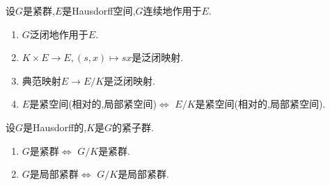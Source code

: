 \begin{proposition}{}{}
	设$G$是紧群,$E$是Hausdorff空间,$G$连续地作用于$E$.
	\begin{enumerate}
		\item $G$泛闭地作用于$E$.
		\item $K\times E\to E,\left(s,x\right)\mapsto sx$是泛闭映射.
		\item 典范映射$E\to E/K$是泛闭映射.
		\item $E$是紧空间(相对的,局部紧空间)$\iff$ $E/K$是紧空间(相对的,局部紧空间).
	\end{enumerate}
\end{proposition}

\begin{corollary}{}{}
	设$G$是Hausdorff的,$K$是$G$的紧子群.
	\begin{enumerate}
		\item $G$是紧群$\iff$ $G/K$是紧群.
		\item $G$是局部紧群$\iff$ $G/K$是局部紧群.
	\end{enumerate}
\end{corollary}


